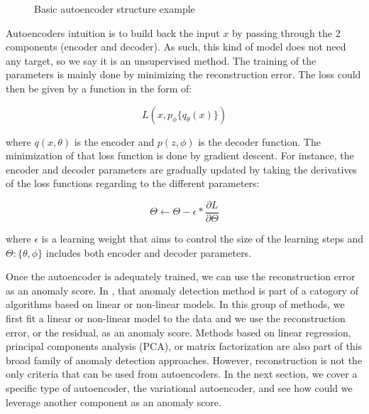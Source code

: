 \documentclass{article}
\def\layersep{2cm}
\begin{document}
\begin{figure}[h]
	\caption{Basic autoencoder structure example}
	\label{fig:basicAE}
\end{figure}

Autoencoders intuition is to build back the input $x$ by passing through the 2 components (encoder and decoder). As such, this kind of model does not need any target, so we say it is an unsupervised method. The training of the parameters is mainly done by minimizing the reconstruction error. The loss could then be given by a function in the form of:

$$
L(x, p_\phi{\{q_\theta(x)\}})
$$

\noindent where $q(x, \theta)$ is the encoder and $p(z,\phi)$ is the decoder function. The minimization of that loss function is done by gradient descent. For instance, the encoder and decoder parameters are gradually updated by taking the derivatives of the loss functions regarding to the different parameters:

\begin{equation} \label{optim}
\Theta \leftarrow \Theta-\epsilon*\frac{\partial L}{\partial\Theta}
\end{equation}

\noindent where $\epsilon$ is a learning weight that aims to control the size of the learning steps and $\Theta : \{\theta, \phi\}$ includes both encoder and decoder parameters.

Once the autoencoder is adequately trained, we can use the reconstruction error as an anomaly score. In \cite{10.5555/3086742}, that anomaly detection method is part of a catogory of algorithms based on linear or non-linear models. In this group of methods, we first fit a linear or non-linear model to the data and we use the reconstruction error, or the residual, as an anomaly score. Methods based on linear regression, principal components analysis (PCA), or matrix factorization are also part of this broad family of anomaly detection approaches. However, reconstruction is not the only criteria that can be used from autoencoders. In the next section, we cover a specific type of autoencoder, the variational autoencoder, and see how could we leverage another component as an anomaly score.
\end{document}
